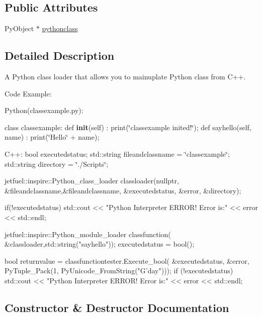 \subsection*{Public Attributes}
\begin{DoxyCompactItemize}
\item 
Py\+Object $\ast$ \hyperlink{classjetfuel_1_1inspire_1_1Python__class__loader_adbcf46681199db320a6b09aec18a2ca8}{pythonclass}
\end{DoxyCompactItemize}


\subsection{Detailed Description}
A Python class loader that allows you to mainuplate Python class from C++.

Code Example\+:

Python(classexample.\+py)\+:

class classexample\+: def {\bfseries init}(self) \+: print(\char`\"{}classexample inited!\char`\"{}); def sayhello(self, name) \+: print(\char`\"{}\+Hello\char`\"{} + name);

C++\+: bool executedstatus; std\+::string fileandclassname = \char`\"{}classexample\char`\"{}; std\+::string directory = \char`\"{}./\+Scripts\char`\"{};

\begin{DoxyVerb}jetfuel::inspire::Python_class_loader classloader(nullptr, 
                        &fileandclassname,&fileandclassname,
                        &executedstatus, &error, &directory);

if(!executedstatus){
    std::cout << "Python Interpreter ERROR! Error is:" << error
    << std::endl;
}

jetfuel::inspire::Python_module_loader classfunction(
                        &classloader,std::string("sayhello"));
executedstatus = bool();

bool returnvalue = classfunctiontester.Execute_bool(
                                    &executedstatus, &error, 
                PyTuple_Pack(1, PyUnicode_FromString("G'day")));
if (!executedstatus) {
    std::cout << "Python Interpreter ERROR! Error is:" << 
    error << std::endl;
}  \end{DoxyVerb}
 

\subsection{Constructor \& Destructor Documentation}
\mbox{\label{classjetfuel_1_1inspire_1_1Python__class__loader_ae8e3d2e3e2b95a5463f5735f2c0f6be2}} 
